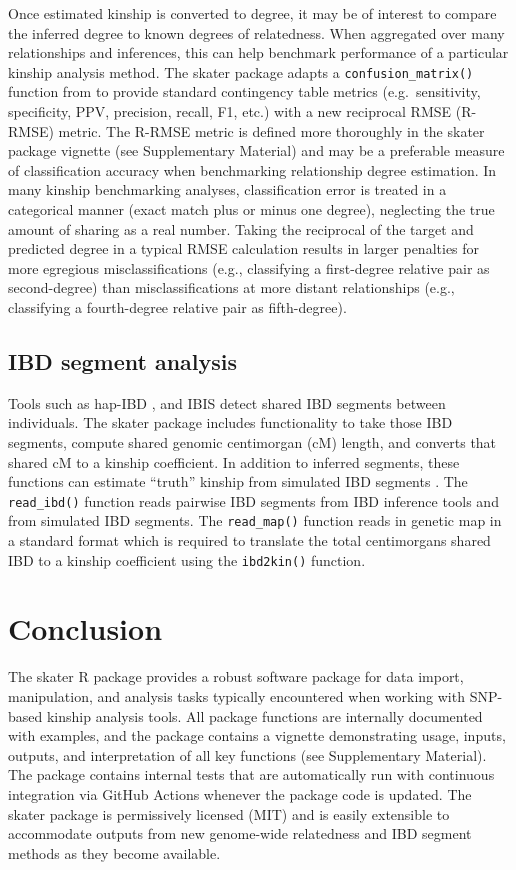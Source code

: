 \documentclass{bioinfo}
\begin{document}
Once estimated kinship is converted to degree, it may be of interest to
compare the inferred degree to known degrees of relatedness. When
aggregated over many relationships and inferences, this can help
benchmark performance of a particular kinship analysis method. The
skater package adapts a \texttt{confusion\_matrix()} function from
\citet{clark2021} to provide standard contingency table metrics
(e.g.~sensitivity, specificity, PPV, precision, recall, F1, etc.) with a
new reciprocal RMSE (R-RMSE) metric. The R-RMSE metric is defined more
thoroughly in the skater package vignette (see Supplementary Material)
and may be a preferable measure of classification accuracy when
benchmarking relationship degree estimation. In many kinship
benchmarking analyses, classification error is treated in a categorical
manner (exact match plus or minus one degree), neglecting the true
amount of sharing as a real number. Taking the reciprocal of the target
and predicted degree in a typical RMSE calculation results in larger
penalties for more egregious misclassifications (e.g., classifying a
first-degree relative pair as second-degree) than misclassifications at
more distant relationships (e.g., classifying a fourth-degree relative
pair as fifth-degree).

\subsection{IBD segment analysis}

Tools such as hap-IBD \citep{zhou2020}, and IBIS \citep{seidman2020}
detect shared IBD segments between individuals. The skater package
includes functionality to take those IBD segments, compute shared
genomic centimorgan (cM) length, and converts that shared cM to a
kinship coefficient. In addition to inferred segments, these functions
can estimate ``truth'' kinship from simulated IBD segments
\citep{caballero2019}. The \texttt{read\_ibd()} function reads pairwise
IBD segments from IBD inference tools and from simulated IBD segments.
The \texttt{read\_map()} function reads in genetic map in a standard
format which is required to translate the total centimorgans shared IBD
to a kinship coefficient using the \texttt{ibd2kin()} function.

\section{Conclusion}

The skater R package provides a robust software package for data import,
manipulation, and analysis tasks typically encountered when working with
SNP-based kinship analysis tools. All package functions are internally
documented with examples, and the package contains a vignette
demonstrating usage, inputs, outputs, and interpretation of all key
functions (see Supplementary Material). The package contains internal
tests that are automatically run with continuous integration via GitHub
Actions whenever the package code is updated. The skater package is
permissively licensed (MIT) and is easily extensible to accommodate
outputs from new genome-wide relatedness and IBD segment methods as they
become available.
\end{document}
